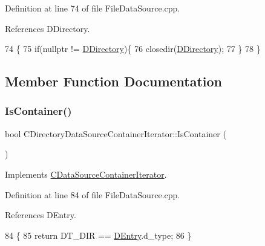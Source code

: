 Definition at line 74 of file File\+Data\+Source.\+cpp.



References D\+Directory.


\begin{DoxyCode}
74                                                                              \{
75     \textcolor{keywordflow}{if}(\textcolor{keyword}{nullptr} != \hyperlink{classCDirectoryDataSourceContainerIterator_a0e07044b1a916e3dd931ae0778317e16}{DDirectory})\{
76         closedir(\hyperlink{classCDirectoryDataSourceContainerIterator_a0e07044b1a916e3dd931ae0778317e16}{DDirectory});
77     \}
78 \}
\end{DoxyCode}


\subsection{Member Function Documentation}
\hypertarget{classCDirectoryDataSourceContainerIterator_a5430df3036bfd75734ffb807b888b208}{}\label{classCDirectoryDataSourceContainerIterator_a5430df3036bfd75734ffb807b888b208} 
\subsubsection{\texorpdfstring{Is\+Container()}{IsContainer()}}
{\footnotesize\ttfamily bool C\+Directory\+Data\+Source\+Container\+Iterator\+::\+Is\+Container (\begin{DoxyParamCaption}{ }\end{DoxyParamCaption})\hspace{0.3cm}{\ttfamily [virtual]}}



Implements \hyperlink{classCDataSourceContainerIterator_aafcccb5733f936b03e1930b09c02df87}{C\+Data\+Source\+Container\+Iterator}.



Definition at line 84 of file File\+Data\+Source.\+cpp.



References D\+Entry.


\begin{DoxyCode}
84                                                        \{
85     \textcolor{keywordflow}{return} DT\_DIR == \hyperlink{classCDirectoryDataSourceContainerIterator_a69dfb8a9f2ab7f71e7d106d4d6c0e29b}{DEntry}.d\_type;
86 \}
\end{DoxyCode}
\hypertarget{classCDirectoryDataSourceContainerIterator_ab89d8af808bff115ac7c096bbec23188}{}\label{classCDirectoryDataSourceContainerIterator_ab89d8af808bff115ac7c096bbec23188} 
